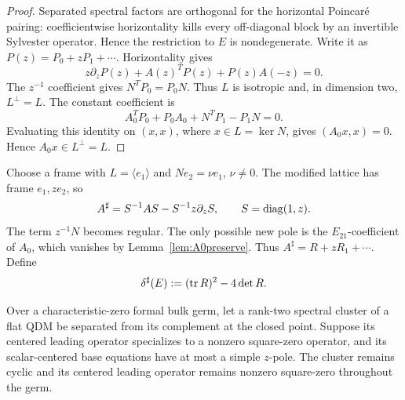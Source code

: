 \begin{proof}
Separated spectral factors are orthogonal for the horizontal Poincar\'e
pairing: coefficientwise horizontality kills every off-diagonal block by an
invertible Sylvester operator.  Hence the restriction to \(E\) is
nondegenerate.  Write it as \(P(z)=P_0+zP_1+\cdots\).  Horizontality gives
\[
 z\partial_zP(z)+A(z)^TP(z)+P(z)A(-z)=0.
\]
The \(z^{-1}\) coefficient gives \(N^TP_0=P_0N\).  Thus \(L\) is isotropic
and, in dimension two, \(L^\perp=L\).  The constant coefficient is
\[
 A_0^TP_0+P_0A_0+N^TP_1-P_1N=0.
\]
Evaluating this identity on \((x,x)\), where \(x\in L=\ker N\), gives
\((A_0x,x)=0\).  Hence \(A_0x\in L^\perp=L\).
\end{proof}

Choose a frame with \(L=\langle e_1\rangle\) and
\(Ne_2=\nu e_1\), \(\nu\ne0\).  The modified lattice has frame
\(e_1,ze_2\), so
\begin{equation}
 A^\sharp=S^{-1}AS-S^{-1}z\partial_zS,
 \qquad S=\operatorname{diag}(1,z).
 \label{eq:Asharp}
\end{equation}
The term \(z^{-1}N\) becomes regular.  The only possible new pole is the
\(E_{21}\)-coefficient of \(A_0\), which vanishes by
Lemma~\ref{lem:A0preserve}.  Thus
\(A^\sharp=R+zR_1+\cdots\).  Define
\begin{equation}
 \delta^\sharp(E):=(\operatorname{tr} R)^2-4\det R.
 \label{eq:res-disc}
\end{equation}

\begin{lemma}
\label{lem:cyclic-primary-persistence}
%
%
Over a characteristic-zero formal bulk germ, let a rank-two spectral
cluster of a flat QDM be separated from its complement at the closed point.
Suppose its centered leading operator specializes to a nonzero square-zero
operator, and its scalar-centered base equations have at most a simple
\(z\)-pole.  The cluster remains cyclic and its centered leading operator
remains nonzero square-zero throughout the germ.
\end{lemma}

